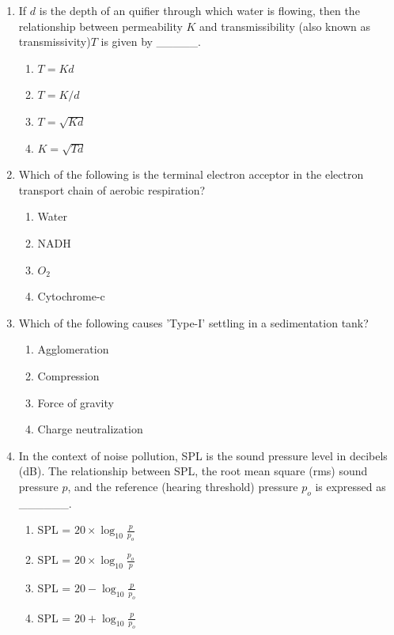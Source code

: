 \documentclass[journal]{IEEEtran}
\begin{document}
\begin{enumerate}[start=1]
\item If $d$ is the depth of an quifier through which water is flowing, then the relationship between permeability $K$ and transmissibility (also known as transmissivity)$T$ is given by \_\_\_\_\_.
\hfill{}
\begin{multicols}{4}
\begin{enumerate}
\item $T = Kd$
\item $T = K/d$
\item $T = \sqrt{Kd}$
\item $K = \sqrt{Td}$
\end{enumerate}
\end{multicols}

\item Which of the following is the terminal electron acceptor in the electron transport chain of aerobic respiration?
\hfill{}
\begin{enumerate}
\item Water
\item NADH
\item $O_2$
\item Cytochrome-c
\end{enumerate}

\item Which of the following causes 'Type-I' settling in a sedimentation tank?
\hfill{}
\begin{enumerate}
    \item Agglomeration
    \item Compression
    \item Force of gravity
    \item Charge neutralization
\end{enumerate}

\item In the context of noise pollution, SPL is the sound pressure level in decibels (dB). The relationship between SPL, the root mean square (rms) sound pressure $p$, and the reference (hearing threshold) pressure $p_o$ is expressed as \_\_\_\_\_\_.
\hfill{}
\begin{enumerate}
    \item SPL = $20 \times \log_{10}\frac{p}{p_o}$
    \item SPL = $20 \times \log_{10}\frac{p_o}{p}$
    \item SPL = $20 - \log_{10}\frac{p}{p_o}$
    \item SPL = $20 + \log_{10}\frac{p}{p_o}$
\end{enumerate}


\end{enumerate}
\end{document}
